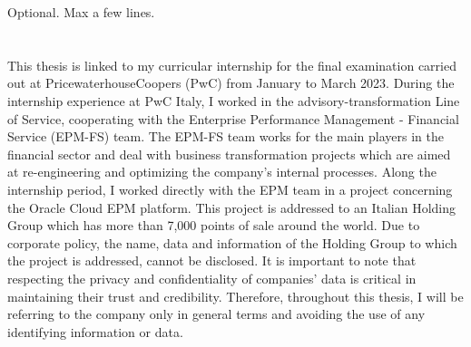 \documentclass[12pt,a4paper,openright,twoside]{book}
\begin{document}
\begin{dedication}
Optional. Max a few lines.
\end{dedication}


\tableofcontents   

\mainmatter

\chapter{\introductionname}
\label{chap:introduction}

This thesis is linked to my curricular internship for the final examination carried out at PricewaterhouseCoopers (PwC) from January to March 2023.
%
During the internship experience at PwC Italy, I worked in the advisory-transformation Line of Service, cooperating with the Enterprise Performance Management - Financial Service (EPM-FS) team.
%
The EPM-FS team works for the main players in the financial sector and deal with business transformation projects which are aimed at re-engineering and optimizing the company's internal processes.
%
Along the internship period, I worked directly with the EPM team in a project concerning the Oracle Cloud EPM platform.
%
This project is addressed to an Italian Holding Group which has more than 7,000 points of sale around the world. 
%
Due to corporate policy, the name, data and information of the Holding Group to which the project is addressed, cannot be disclosed. 
%
It is important to note that respecting the privacy and confidentiality of companies' data is critical in maintaining their trust and credibility.
%
Therefore, throughout this thesis, I will be referring to the company only in general terms and avoiding the use of any identifying information or data. \\
\end{document}
